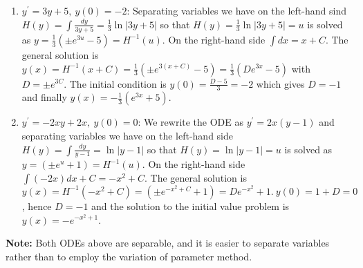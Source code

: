 \documentclass[11pt,a4paper,twoside]{article}
\begin{document}
	\begin{enumerate}[\bfseries 1)]
		\item $y^\prime = 3y + 5,\ y(0) = -2$: Separating variables we have on the left-hand sind $H(y) = \int \frac{dy}{3y+5}=\frac{1}{3}\ln |3y+5|$ so that $H(y) = \frac{1}{3}\ln |3y+5| = u$ is solved as $y=\frac{1}{3}(\pm e^{3u}-5) = H^{-1}(u).$ On the right-hand side $\int dx = x+C$. The general solution is $y(x)=H^{-1}(x+C)=\frac{1}{3}(\pm e^{3(x+C)}-5) = \frac{1}{3}(De^{3x}-5)$ with $D=\pm e^{3C}$. The initial condition is $y(0) = \frac{D-5}{3} = -2$ which gives $D=-1$ and finally $y(x)=-\frac{1}{3}(e^{3x}+5)$.
		\item $y^\prime = -2xy+2x,\ y(0) = 0$: We rewrite the ODE as $y^\prime = 2x(y-1)$ and separating variables we have on the left-hand side $H(y)=\int \frac{dy}{y-1}=\ln |y-1|$ so that $H(y) = \ln |y-1| = u$ is solved as $y = (\pm e^u + 1) = H^{-1}(u)$. On the right-hand side $\int (-2x)dx + C = -x^2+C$. The general solution is $y(x)=H^{-1}(-x^2+C)=\left(\pm e^{-x^2 + C}+1\right) = De^{-x^2}+1.\ y(0) = 1+D=0$, hence $D=-1$ and the solution to the initial value problem is $y(x)=-e^{-x^2+1}$.
	\end{enumerate}
	\textbf{Note:} Both ODEs above are separable, and it is easier to separate variables rather than to employ the variation of parameter method.\par
\end{document}
